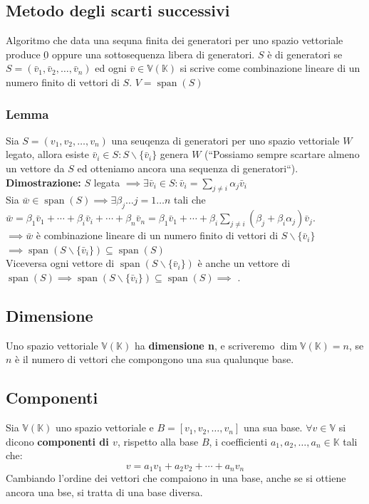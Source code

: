\documentclass{article}
\DeclareMathOperator{\Span}{span}
\renewcommand\fbox{\fcolorbox{red}{white}}
\newcommand{\V}{\mathbb{V} (\mathbb{K})}
\newcommand{\s}[2]{#1_1, #1_2, \ldots, #1_{#2}}
\newcommand{\ah}{\alpha}
\newcommand{\bh}{\beta}
\begin{document}
\subsection{Metodo degli scarti successivi}
Algoritmo che data una sequna finita dei generatori per uno spazio vettoriale produce $\underbar{0}$ oppure una sottosequenza libera di generatori.
$S$ è di generatori se $S= (\s{\bar{v}}{n})$ ed ogni $\bar{v}\in\V$ si scrive come combinazione lineare di un numero finito di vettori di $S$. $V = \Span(S)$

\subsubsection{Lemma}
Sia $S=(\s{v}{n})$ una seuqenza di generatori per uno spazio vettoriale $W$ legato, allora esiste $\bar{v}_i\in S:S\smallsetminus\{\bar v_i\}$ genera $W$ (``Possiamo sempre scartare almeno un vettore da $S$ ed otteniamo ancora una sequenza di generatori``).\\
\textbf{Dimostrazione:} $S$ legata $\implies\exists\bar{v}_i\in S:\bar v_i=\sum_{j\ne i}^{}\ah_j\bar v_i$ \\
Sia $\bar{w}\in\Span(S)\implies\exists\bh_j\ldots j=1\ldots n$ tali che $\bar{w}=\bh_1\bar{v}_1+\cdots+\bh_i\bar{v}_i+\cdots+\bh_n\bar{v}_n = \bh_1\bar{v}_1+\cdots+\bh_i\sum_{j\ne i}^{}(\bh_j+\bh_i\ah_j)\bar{v}_j$.\\
$\implies \bar{w}$ è combinazione lineare di un numero finito di vettori di $S\smallsetminus\{\bar{v}_i\}$\\
$\implies \Span(S\smallsetminus\{\bar{v}_i\})\subseteq\Span(S)$\\
Viceversa ogni vettore di $\Span(S\smallsetminus\{\bar{v}_i\})$ è anche un vettore di $\Span(S)\implies\Span(S\smallsetminus\{\bar{v}_i\})\subseteq\Span(S)\implies$ \fbox{$\Span(S\smallsetminus\{\bar{v}_i\})=\Span(S)$}.

\subsection{Dimensione}
Uno spazio vettoriale $\V$ ha \textbf{dimensione n}, e scriveremo $\dim\V = n$,
se $n$ è il numero di vettori che compongono una sua qualunque base.

\subsection{Componenti}
Sia $\V$ uno spazio vettoriale e $B = [\s{v}{n}]$ una sua base. $\forall v \in
    \mathbb V$ si dicono \textbf{componenti di $v$}, rispetto alla base $B$, i
coefficienti $a_1, a_2,\ldots,a_n \in \mathbb K$ tali che:
\[
    v = a_1 v_1+a_2 v_2 +\cdots+a_n v_n
\]
Cambiando l'ordine dei vettori che compaiono in una base, anche se si ottiene
ancora una bse, si tratta di una base diversa.
\end{document}
